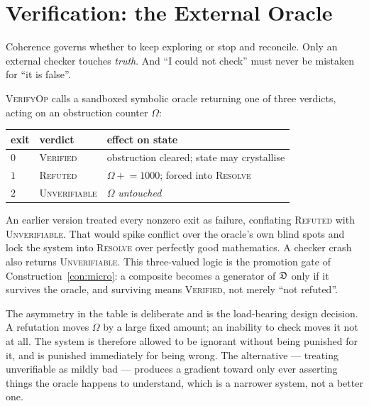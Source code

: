 \chapter{Verification: the External Oracle}\label{ch:verify}

\begin{intu}\Intu
Coherence governs whether to keep exploring or stop and reconcile. Only
an external checker touches \emph{truth}. And ``I could not check'' must
never be mistaken for ``it is false''.
\end{intu}

\begin{definition}\label{def:verify}
\textsc{VerifyOp} calls a sandboxed symbolic oracle returning one of
three verdicts, acting on an obstruction counter $\Omega$:
\begin{center}
\renewcommand{\arraystretch}{1.25}
\begin{tabular}{@{}lll@{}}
\toprule
exit & verdict & effect on state\\
\midrule
$0$ & \textsc{Verified} & obstruction cleared; state may crystallise\\
$1$ & \textsc{Refuted} & $\Omega\mathrel{+}=1000$; forced into \textsc{Resolve}\\
$2$ & \textsc{Unverifiable} & $\Omega$ \emph{untouched}\\
\bottomrule
\end{tabular}
\end{center}
\end{definition}

\begin{remark}\label{rem:threevalued}
An earlier version treated every nonzero exit as failure, conflating
\textsc{Refuted} with \textsc{Unverifiable}. That would spike conflict
over the oracle's own blind spots and lock the system into
\textsc{Resolve} over perfectly good mathematics. A checker crash also
returns \textsc{Unverifiable}. This three-valued logic is the promotion
gate of Construction~\ref{con:micro}: a composite becomes a generator of
$\mathfrak{D}$ only if it survives the oracle, and surviving means
\textsc{Verified}, not merely ``not refuted''.
\end{remark}

\begin{hon}\Hon
The asymmetry in the table is deliberate and is the load-bearing design
decision. A refutation moves $\Omega$ by a large fixed amount; an
inability to check moves it not at all. The system is therefore allowed
to be ignorant without being punished for it, and is punished
immediately for being wrong. The alternative --- treating unverifiable
as mildly bad --- produces a gradient toward only ever asserting things
the oracle happens to understand, which is a narrower system, not a
better one.
\end{hon}

